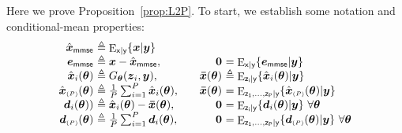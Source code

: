 \documentclass{article}
\theoremstyle{plain}
\theoremstyle{definition}
\theoremstyle{remark}
\newcommand{\defn}{\triangleq}
\newcommand{\ovec}[1]{\boldsymbol{\Bar{#1}}}
\newcommand{\hvec}[1]{\ensuremath{\Hat{\boldsymbol{#1}}}}
\renewcommand{\vec}[1]{\ensuremath{\boldsymbol{#1}}}
\DeclareMathOperator{\E}{E}
\newcommand{\propref}[1]{Proposition~\ref{prop:#1}}
\newcommand{\mmse}{_{\mathsf{mmse}}}
\newcommand{\Exgy}{\E_{\mathsf{x}|\mathsf{y}}}
\newcommand{\Ezigy}{\E_{\mathsf{z_i}|\mathsf{y}}}
\newcommand{\EzPgy}{\E_{\mathsf{z_1,...,z_P}|\mathsf{y}}}
\newcommand{\avgP}{_{\scriptscriptstyle (P)}}
\begin{document}
Here we prove \propref{L2P}.
To start, we establish some notation and conditional-mean properties:
%
%
\begin{equation}
\begin{array}{r@{~}l@{\qquad}r@{~}l}
\hvec{x}\mmse &\defn \Exgy\{\vec{x}|\vec{y}\} \\
\vec{e}\mmse &\defn \vec{x}-\hvec{x}\mmse, & %
\vec{0} &= \Exgy\{\vec{e}\mmse|\vec{y}\} \\ 
\hvec{x}_i(\vec{\theta}) &\defn G_{\vec{\theta}}(\vec{z}_i,\vec{y}), &
\ovec{x}(\vec{\theta}) &\defn \Ezigy\{\hvec{x}_i(\vec{\theta})|\vec{y}\} \\ %
\hvec{x}\avgP(\vec{\theta}) &\defn \textstyle \frac{1}{P} \sum_{i=1}^P \hvec{x}_i(\vec{\theta}), & %
\ovec{x}(\vec{\theta}) &= \EzPgy\{\hvec{x}\avgP(\vec{\theta})|\vec{y}\} \\ %
\vec{d}_i(\vec{\theta})) &\defn \hvec{x}_i(\vec{\theta})-\ovec{x}(\vec{\theta}), &
\vec{0} &= \Ezigy\{\vec{d}_i(\vec{\theta})|\vec{y}\}~\forall\vec{\theta} \\ %
\vec{d}\avgP(\vec{\theta}) &\defn \textstyle \frac{1}{P} \sum_{i=1}^P \vec{d}_i(\vec{\theta}), &
\vec{0} &= \EzPgy\{\vec{d}\avgP(\vec{\theta})|\vec{y}\}~\forall\vec{\theta} \\ %
\end{array}
\label{eq:quantities}
\end{equation}
\end{document}
